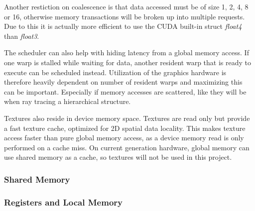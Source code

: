 
Another restiction on coalescence is that data accessed must be of
size 1, 2, 4, 8 or 16, otherwise memory transactions will be broken up
into multiple requests. Due to this it is actually more efficient to
use the CUDA built-in struct \textit{float4} than \textit{float3}.


The scheduler can also help with hiding latency from a global memory
access. If one warp is stalled while waiting for data, another
resident warp that is ready to execute can be scheduled
instead. Utilization of the graphics hardware is therefore heavily
dependent on number of resident warps and maximizing this can be
important. Especially if memory accesses are scattered, like they will
be when ray tracing a hierarchical structure.


Textures also reside in device memory space. Textures are read only
but provide a fast texture cache, optimized for 2D spatial data
locality. This makes texture access faster than pure global memory
access, as a device memory read is only performed on a cache miss. On
current generation hardware, global memory can use shared memory as a
cache, so textures will not be used in this project.

\subsubsection{Shared Memory}






\subsubsection{Registers and Local Memory}

